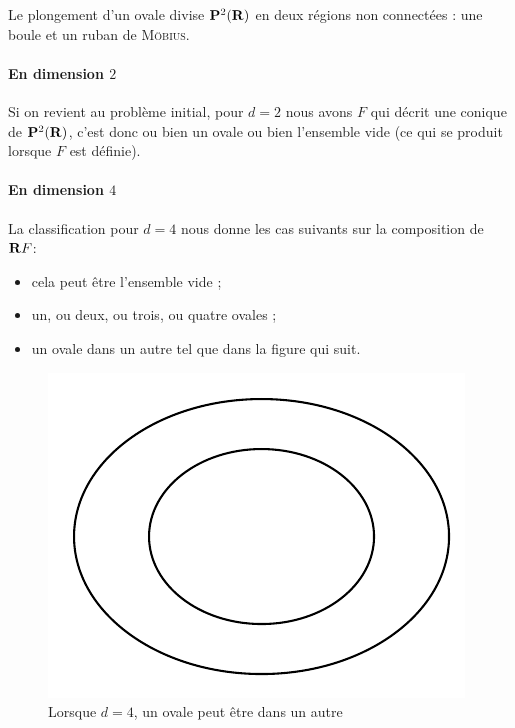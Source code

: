\documentclass{livre}
\begin{document}
Le plongement d'un ovale divise $\mathbf{P}^{2}(\mathbf{R})$ en deux régions non connectées : une boule et un ruban de \textsc{Möbius}.

\paragraph{En dimension $2$}Si on revient au problème initial, pour $d=2$ nous avons $F$ qui décrit une conique de $\mathbf{P}^{2}(\mathbf{R})$, c'est donc ou bien un ovale ou bien l'ensemble vide (ce qui se produit lorsque $F$ est définie).


\paragraph{En dimension $4$}La classification pour $d=4$ nous donne les cas suivants sur la composition de $\mathbf{R} F$:
\begin{itemize}
\item cela peut être l'ensemble vide ;
\item un, ou deux, ou trois, ou quatre ovales ;
\item un ovale dans un autre tel que dans la figure qui suit.
\end{itemize}

\begin{figure}[H]
\begin{center}
\includegraphics[scale=0.6]{fig1}
\end{center}
\caption{Lorsque $d=4$, un ovale peut être dans un autre}\label{fig1}
\end{figure}
\end{document}
